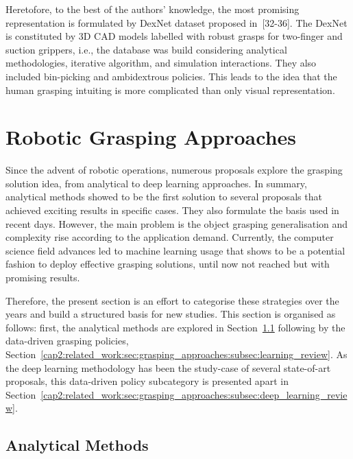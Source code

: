 Heretofore, to the best of the authors' knowledge, the most promising representation is formulated by DexNet dataset proposed in~[32-36]. The DexNet is constituted by 3D CAD models labelled with robust grasps for two-finger and suction grippers, i.e., the database was build considering analytical methodologies, iterative algorithm, and simulation interactions. They also included bin-picking and ambidextrous policies. This leads to the idea that the human grasping intuiting is more complicated than only visual representation.



\section{Robotic Grasping Approaches}
\label{cap2:related_work:sec:grasping_approaches}

Since the advent of robotic operations, numerous proposals explore the grasping solution idea, from analytical to deep learning approaches. In summary, analytical methods showed to be the first solution to several proposals that achieved exciting results in specific cases. They also formulate the basis used in recent days. However, the main problem is the object grasping generalisation and complexity rise according to the application demand. Currently, the computer science field advances led to machine learning usage that shows to be a potential fashion to deploy effective grasping solutions, until now not reached but with promising results. 

Therefore, the present section is an effort to categorise these strategies over the years and build a structured basis for new studies. This section is organised as follows: first, the analytical methods are explored in Section~\ref{cap2:related_work:sec:grasping_approaches:subsec:analytical_review} following by the data-driven grasping policies, Section~\ref{cap2:related_work:sec:grasping_approaches:subsec:learning_review}. As the deep learning methodology has been the study-case of several state-of-art proposals, this data-driven policy subcategory is presented apart in Section~\ref{cap2:related_work:sec:grasping_approaches:subsec:deep_learning_review}.

\subsection{Analytical Methods}
\label{cap2:related_work:sec:grasping_approaches:subsec:analytical_review}

